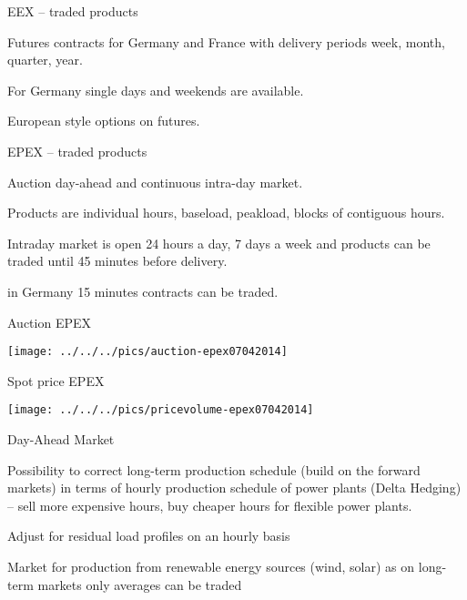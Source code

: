 


{EEX -- traded products}






	Futures contracts for Germany and France with delivery periods week, month, quarter, year.


	For Germany single days and weekends are available.


	European style options on futures.





{EPEX -- traded products}






	Auction day-ahead and continuous intra-day market.


	Products are individual hours, baseload, peakload, blocks of contiguous hours.


	Intraday market is open 24 hours a day, 7 days a week and products can be traded until 45 minutes before delivery.


	in Germany 15 minutes contracts can be traded.





{Auction EPEX}
\begin{center}
\texttt{[image: ../../../pics/auction-epex07042014]}
\end{center}

{Spot price EPEX}
\begin{center}
\texttt{[image: ../../../pics/pricevolume-epex07042014]}
\end{center}

{Day-Ahead Market }






	Possibility to correct long-term production schedule  (build on the forward markets) in terms of hourly production schedule of power plants (Delta Hedging) -- sell more expensive hours, buy cheaper hours for flexible power plants.


	Adjust for residual load profiles on an hourly basis


	Market for production from renewable energy sources (wind, solar) as on long-term markets only averages can be traded


